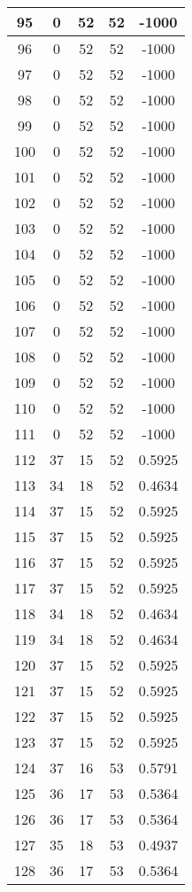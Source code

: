 \documentclass[letterpaper, 12pt]{article}
\begin{document}
\begin{longtable}{|c|c|c|c|c|}
95 & 0 & 52 & 52 & -1000 \\
\hline
96 & 0 & 52 & 52 & -1000 \\
\hline
97 & 0 & 52 & 52 & -1000 \\
\hline
98 & 0 & 52 & 52 & -1000 \\
\hline
99 & 0 & 52 & 52 & -1000 \\
\hline
100 & 0 & 52 & 52 & -1000 \\
\hline
101 & 0 & 52 & 52 & -1000 \\
\hline
102 & 0 & 52 & 52 & -1000 \\
\hline
103 & 0 & 52 & 52 & -1000 \\
\hline
104 & 0 & 52 & 52 & -1000 \\
\hline
105 & 0 & 52 & 52 & -1000 \\
\hline
106 & 0 & 52 & 52 & -1000 \\
\hline
107 & 0 & 52 & 52 & -1000 \\
\hline
108 & 0 & 52 & 52 & -1000 \\
\hline
109 & 0 & 52 & 52 & -1000 \\
\hline
110 & 0 & 52 & 52 & -1000 \\
\hline
111 & 0 & 52 & 52 & -1000 \\
\hline
112 & 37 & 15 & 52 & 0.5925 \\
\hline
113 & 34 & 18 & 52 & 0.4634 \\
\hline
114 & 37 & 15 & 52 & 0.5925 \\
\hline
115 & 37 & 15 & 52 & 0.5925 \\
\hline
116 & 37 & 15 & 52 & 0.5925 \\
\hline
117 & 37 & 15 & 52 & 0.5925 \\
\hline
118 & 34 & 18 & 52 & 0.4634 \\
\hline
119 & 34 & 18 & 52 & 0.4634 \\
\hline
120 & 37 & 15 & 52 & 0.5925 \\
\hline
121 & 37 & 15 & 52 & 0.5925 \\
\hline
122 & 37 & 15 & 52 & 0.5925 \\
\hline
123 & 37 & 15 & 52 & 0.5925 \\
\hline
124 & 37 & 16 & 53 & 0.5791 \\
\hline
125 & 36 & 17 & 53 & 0.5364 \\
\hline
126 & 36 & 17 & 53 & 0.5364 \\
\hline
127 & 35 & 18 & 53 & 0.4937 \\
\hline
128 & 36 & 17 & 53 & 0.5364 \\

\end{longtable}
\end{document}
